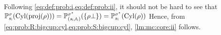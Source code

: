 Following \cref{eq:def:prob:i,eq:def:prob:ii}, it should not be hard
to see that
%
$\mathbb{P}^{\sigma}_{{s_{\textsf{i}}}}(\mathrm{Cyl}(\mathrm{proj}(\rho))) =
\mathbb{P}^{\sigma^\star}_{({s_{\textsf{i}}},{t_{\textsf{i}}})}(\{\rho\bot\}) =
\mathbb{P}^{\sigma^\star}_{{s_{\textsf{i}}}}(\mathrm{Cyl}(\rho))$
%
Hence, from \cref{eq:prob:R:bigcup:cyl,eq:prob:S:bigcup:cyl},
\cref{lm:mc:core:ii} follows.
